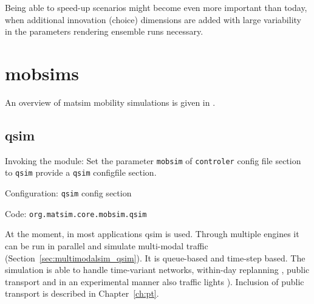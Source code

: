 Being able to speed-up scenarios might become even more important than today, when additional innovation (choice) dimensions are added with large variability in the parameters rendering ensemble runs necessary. %


\section{\protect\glspl{mobsim}}
\label{sec:mobsims}
An overview of \gls{matsim} mobility simulations is given in \citet[][]{Dobler_TechRep_IVT_2011}. %

\subsection{\protect\gls{qsim}}
\label{sec:qsim}
\begin{compactitem}
\item Invoking the module: Set the parameter \lstinline|mobsim| of \lstinline|controler| config file section to \lstinline|qsim| provide a \lstinline|qsim| \gls{configfile} section.
\item Configuration: \lstinline|qsim| config section
\item Code: \lstinline|org.matsim.core.mobsim.qsim|
\end{compactitem}

At the moment, in most applications \gls{qsim} \citep[][]{Dobler_TechRep_IVT_2011, Dobler_STRC_2010} is used. 
Through multiple engines it can be run in parallel and simulate multi-modal traffic (Section~\ref{sec:multimodalsim_qsim}). It is queue-based and time-step based. The simulation is able to handle time-variant networks, within-day replanning \citep[][]{Dobler_TechRep_IVT_2009}, public transport \citep[][]{Rieser_PhDThesis_2010} and in an experimental manner also traffic lights \citep[][]{Neumann_MastersThesis_2008}). Inclusion of public transport is described in Chapter~\ref{ch:pt}.

